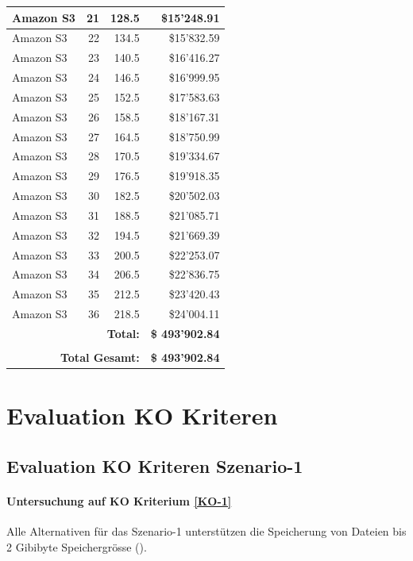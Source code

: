 \begin{table}
\begin{center}
\begin{tabular}{|l|r|r|r|}
Amazon S3 & 21 & 128.5 & \$15'248.91 \\ \hline
Amazon S3 & 22 & 134.5 & \$15'832.59 \\ \hline
Amazon S3 & 23 & 140.5 & \$16'416.27 \\ \hline
Amazon S3 & 24 & 146.5 & \$16'999.95 \\ \hline
Amazon S3 & 25 & 152.5 & \$17'583.63 \\ \hline
Amazon S3 & 26 & 158.5 & \$18'167.31 \\ \hline
Amazon S3 & 27 & 164.5 & \$18'750.99 \\ \hline
Amazon S3 & 28 & 170.5 & \$19'334.67 \\ \hline
Amazon S3 & 29 & 176.5 & \$19'918.35 \\ \hline
Amazon S3 & 30 & 182.5 & \$20'502.03 \\ \hline
Amazon S3 & 31 & 188.5 & \$21'085.71 \\ \hline
Amazon S3 & 32 & 194.5 & \$21'669.39 \\ \hline
Amazon S3 & 33 & 200.5 & \$22'253.07 \\ \hline
Amazon S3 & 34 & 206.5 & \$22'836.75 \\ \hline
Amazon S3 & 35 & 212.5 & \$23'420.43 \\ \hline
Amazon S3 & 36 & 218.5 & \$24'004.11 \\ \hline
\multicolumn{3}{r|}{\textbf{Total:}} & \textbf{\$ 493'902.84}
 \\ \cline{4-4}
\multicolumn{4}{c}{} \\ \cline{4-4}
\multicolumn{3}{r|}{\textbf{Total Gesamt:}} & \textbf{\$ 493'902.84}
 \\ \cline{4-4}
\end{tabular}
\end{center}
\label{tab:KostenAmazonS3S2}
\end{table}




\section{Evaluation KO Kriteren}
\subsection{Evaluation KO Kriteren Szenario-1}

\paragraph*{Untersuchung auf KO Kriterium \ref{KO-1}}
Alle Alternativen für das Szenario-1 unterstützen die Speicherung von Dateien bis 2 Gibibyte Speichergrösse ().

